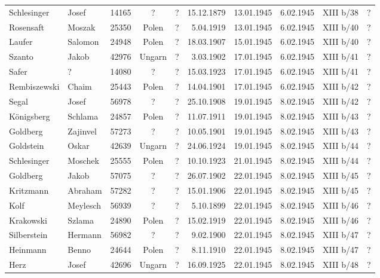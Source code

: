 \begin{tiny}
\begin{longtable}[l]{|l|l|r|c|c|r|r|r|c|r|}
Schlesinger  &  Josef  & 14165 &  ?  &  ?  & 15.12.1879 & 13.01.1945 & 6.02.1945 &  XIII b/38  &  ? \\[3pt]
Rosensaft  &  Moszak  & 25350 &  Polen  &  ?  & 5.04.1919 & 13.01.1945 & 6.02.1945 &  XIII b/40  &  ? \\[3pt]
Laufer  &  Salomon  & 24948 &  Polen  &  ?  & 18.03.1907 & 15.01.1945 & 6.02.1945 &  XIII b/40  &  ? \\[3pt]
Szanto  &  Jakob  & 42976 &  Ungarn  &  ?  & 3.03.1902 & 17.01.1945 & 6.02.1945 &  XIII b/41  &  ? \\[3pt]
Safer  &  ?  & 14080 &  ?  &  ?  & 15.03.1923 & 17.01.1945 & 6.02.1945 &  XIII b/41  &  ? \\[3pt]
Rembiszewski  &  Chaim  & 25443 &  Polen  &  ?  & 14.04.1901 & 17.01.1945 & 6.02.1945 &  XIII b/42  &  ? \\[3pt]
Segal  &  Josef  & 56978 &  ?  &  ?  & 25.10.1908 & 19.01.1945 & 8.02.1945 &  XIII b/42  &  ? \\[3pt]
Königsberg  &  Schlama  & 24857 &  Polen  &  ?  & 11.07.1911 & 19.01.1945 & 8.02.1945 &  XIII b/43  &  ? \\[3pt]
Goldberg  &  Zajinvel  & 57273 &  ?  &  ?  & 10.05.1901 & 19.01.1945 & 8.02.1945 &  XIII b/43  &  ? \\[3pt]
Goldstein   &  Oskar  & 42639 &  Ungarn  &  ?  & 24.06.1924 & 19.01.1945 & 8.02.1945 &  XIII b/44  &  ? \\[3pt]
Schlesinger  &  Moschek  & 25555 &  Polen  &  ?  & 10.10.1923 & 21.01.1945 & 8.02.1945 &  XIII b/44  &  ? \\[3pt]
Goldberg  &  Jakob  & 57075 &  ?  &  ?  & 26.07.1902 & 22.01.1945 & 8.02.1945 &  XIII b/45  &  ? \\[3pt]
Kritzmann  &  Abraham  & 57282 &  ?  &  ?  & 15.01.1906 & 22.01.1945 & 8.02.1945 &  XIII b/45  &  ? \\[3pt]
Kolf  &  Meylesch  & 56939 &  ?  &  ?  & 5.10.1899 & 22.01.1945 & 8.02.1945 &  XIII b/46  &  ? \\[3pt]
Krakowski  &  Szlama  & 24890 &  Polen  &  ?  & 15.02.1919 & 22.01.1945 & 8.02.1945 &  XIII b/46  &  ? \\[3pt]
Silberstein  &  Hermann  & 56982 &  ?  &  ?  & 9.02.1900 & 22.01.1945 & 8.02.1945 &  XIII b/47  &  ? \\[3pt]
Heinmann  &  Benno  & 24644 &  Polen  &  ?  & 8.11.1910 & 22.01.1945 & 8.02.1945 &  XIII b/47  &  ? \\[3pt]
Herz  &  Josef  & 42696 &  Ungarn  &  ?  &  16.09.1925 & 22.01.1945 & 8.02.1945 &  XIII b/48  &  ? \\[3pt]

\end{longtable}
\end{tiny}
